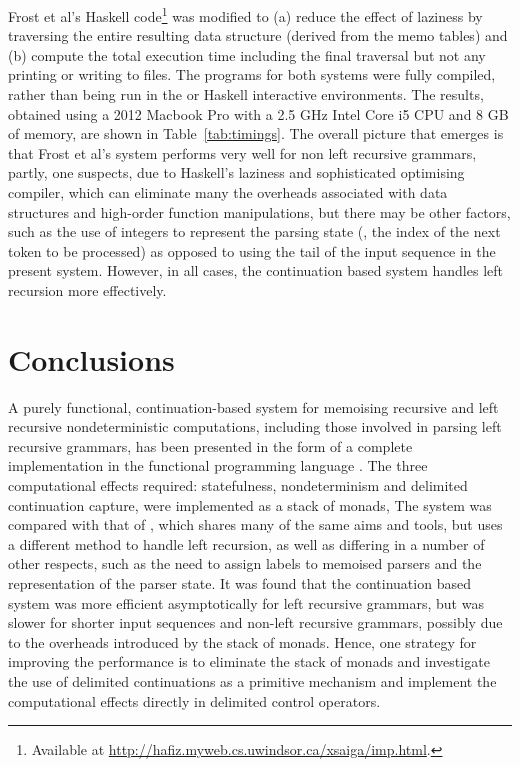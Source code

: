 Frost et al's Haskell code\footnote{Available at \url{http://hafiz.myweb.cs.uwindsor.ca/xsaiga/imp.html}.}
was modified to (a) reduce the effect of laziness by traversing the entire resulting data
structure (derived from the memo tables) and (b) compute the total execution time
including the final traversal but not any printing or writing to files.
The programs for both systems were fully compiled, rather than being run in the
\OCaml or Haskell interactive environments. The results, obtained using
a 2012 Macbook Pro with a 2.5 GHz Intel Core i5 CPU and 8 GB of memory, are shown
in Table~\ref{tab:timings}. The overall picture that emerges is that Frost et al's system
performs very well for non left recursive grammars, partly, one suspects, due to Haskell's laziness and
sophisticated optimising compiler, which can eliminate many the overheads associated with
data structures and high-order function manipulations, but there may be other factors,
such as the use of integers to represent the parsing state (\ie, the index of the next token to
be processed) as opposed to using the tail of the input sequence in the present system.
However, in all cases, the continuation based system handles 
left recursion more effectively.


\section{Conclusions}
\label{s:conclusion}

A purely functional, continuation-based system for memoising recursive and left 
recursive nondeterministic computations, including those involved in parsing
left recursive grammars, has been presented in the form of a complete implementation
in the functional programming language \OCaml. The three computational effects 
required: statefulness, nondeterminism and delimited continuation capture, were
implemented as a stack of monads,
The system was compared with that of \citet{FrostHafizCallaghan2007},
which shares many of the same aims and tools, but uses a different method to handle
left recursion, as well as differing in a number of other respects, such as the need to
assign labels to memoised parsers and the representation of the parser state.
It was found that the continuation based system was more efficient asymptotically
for left recursive grammars, but was slower for shorter input sequences and non-left
recursive grammars, possibly due to the overheads introduced by the stack of monads.
Hence, one strategy for improving the performance is to eliminate the stack of monads and investigate the
use of delimited continuations as a primitive mechanism and implement the 
computational effects directly in delimited control operators.

